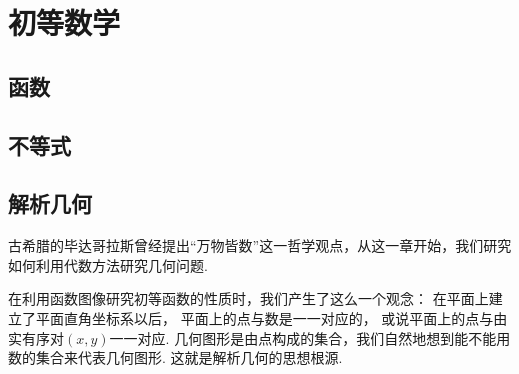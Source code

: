 \part{初等数学}
% 
% 

\chapter{函数}











% 




\chapter{不等式}




% 

\chapter{解析几何}
古希腊的毕达哥拉斯曾经提出“万物皆数”这一哲学观点，从这一章开始，我们研究如何利用代数方法研究几何问题.

在利用函数图像研究初等函数的性质时，我们产生了这么一个观念：
在平面上建立了平面直角坐标系以后，
平面上的点与数是一一对应的，
或说平面上的点与由实有序对\((x,y)\)一一对应.
几何图形是由点构成的集合，我们自然地想到能不能用数的集合来代表几何图形.
这就是解析几何的思想根源.


